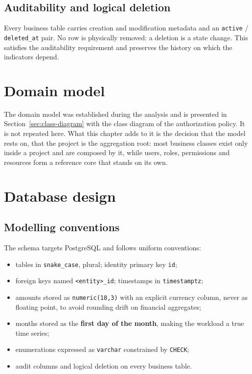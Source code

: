 \subsection{Auditability and logical deletion}
Every business table carries creation and modification metadata and an \texttt{active} /
\texttt{deleted\_at} pair. No row is physically removed: a deletion is a state change. This
satisfies the auditability requirement and preserves the history on which the indicators depend.

\section{Domain model}
The domain model was established during the analysis and is presented in
Section~\ref{sec:class-diagram} with the class diagram of the authorization policy. It is not
repeated here. What this chapter adds to it is the decision that the model rests on, that the
project is the aggregation root: most business classes exist only inside a project and are
composed by it, while users, roles, permissions and resources form a reference core that stands on
its own.

\section{Database design}

\subsection{Modelling conventions}
The schema targets PostgreSQL and follows uniform conventions:

\begin{itemize}
  \item tables in \texttt{snake\_case}, plural; identity primary key \texttt{id};
  \item foreign keys named \texttt{<entity>\_id}; timestamps in \texttt{timestamptz};
  \item amounts stored as \texttt{numeric(18,3)} with an explicit currency column, never as
        floating point, to avoid rounding drift on financial aggregates;
  \item months stored as the \textbf{first day of the month}, making the workload a true time
        series;
  \item enumerations expressed as \texttt{varchar} constrained by \texttt{CHECK};
  \item audit columns and logical deletion on every business table.
\end{itemize}

